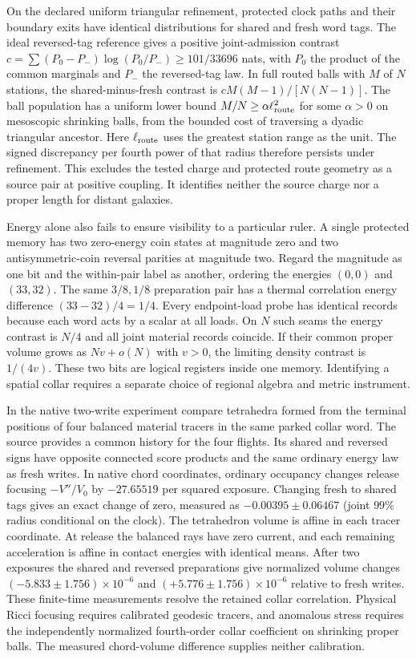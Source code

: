 \documentclass[11pt]{article}
\begin{document}
On the declared uniform triangular refinement, protected clock paths and
their boundary exits have identical distributions for shared and fresh
word tags. The ideal reversed-tag reference gives a positive joint-admission
contrast \(c=\sum(P_0-P_-)\log(P_0/P_-)\ge101/33696\) nats, with \(P_0\)
the product of the common marginals and \(P_-\) the reversed-tag law. In
full routed balls with \(M\) of \(N\) stations, the shared-minus-fresh
contrast is \(cM(M-1)/[N(N-1)]\). The ball population has a uniform lower
bound \(M/N\ge\alpha\ell_{\rm route}^2\) for some \(\alpha>0\) on
mesoscopic shrinking balls, from the bounded cost of traversing a dyadic
triangular ancestor. Here \(\ell_{\rm route}\) uses the greatest station
range as the unit. The signed discrepancy per fourth power of that radius
therefore persists under refinement. This excludes the tested charge and
protected route geometry as a source pair at positive coupling. It identifies
neither the source charge nor a proper length for distant galaxies.

Energy alone also fails to ensure visibility to a particular ruler.
A single protected memory has two zero-energy coin states at
magnitude zero and two antisymmetric-coin reversal parities at
magnitude two. Regard the magnitude as one bit and the within-pair
label as another, ordering the energies $(0,0)$ and $(33,32)$.
The same $3/8,1/8$ preparation pair has a thermal correlation energy
difference $(33-32)/4=1/4$. Every endpoint-load probe has identical
records because each word acts by a scalar at all loads. On $N$
such seams the energy contrast is $N/4$ and all joint material
records coincide. If their common proper volume grows as $Nv+o(N)$
with $v>0$, the limiting density contrast is $1/(4v)$. These two
bits are logical registers inside one memory. Identifying a spatial
collar requires a separate choice of regional algebra and metric
instrument.

In the native two-write experiment compare tetrahedra formed from the
terminal positions of four balanced material tracers in the same
parked collar word. The source provides a common history for the four
flights. Its shared and reversed signs have opposite connected
score products and the same ordinary energy law as fresh writes.
In native chord coordinates, ordinary occupancy changes release
focusing $-V''/V_0$ by $-27.65519$ per squared exposure.
Changing fresh to shared tags gives an exact change of zero, measured
as $-0.00395\pm0.06467$ (joint $99\%$ radius conditional on the clock).
The tetrahedron volume is affine in each tracer coordinate. At
release the balanced rays have zero current, and each remaining
acceleration is affine in contact energies with identical means.
After two exposures the shared and reversed preparations give
normalized volume changes $(-5.833\pm1.756)\times10^{-6}$ and
$(+5.776\pm1.756)\times10^{-6}$ relative to fresh writes. These
finite-time measurements resolve the retained collar correlation.
Physical Ricci focusing requires calibrated geodesic tracers, and
anomalous stress requires the independently normalized fourth-order
collar coefficient on shrinking proper balls. The measured chord-volume
difference supplies neither calibration.
\end{document}
